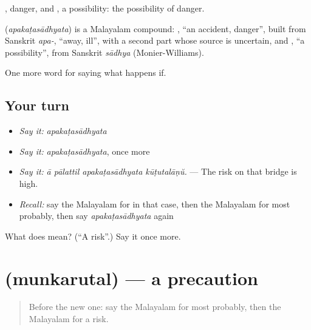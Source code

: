 , danger, and , a possibility: the possibility of danger.

\begin{cousinweb}
\textbf{} (\emph{apakaṭasādhyata}) is a Malayalam compound: , \textquotedblleft{}an accident, danger\textquotedblright{}, built from Sanskrit \emph{apa-}, \textquotedblleft{}away, ill\textquotedblright{}, with a second part whose source is uncertain, and , \textquotedblleft{}a possibility\textquotedblright{}, from Sanskrit \emph{sādhya} (Monier-Williams).
\end{cousinweb}

\begin{grammarlens}[title={What you've built}]
One more word for saying what happens if.
\end{grammarlens}

\subsection*{Your turn}
\begin{itemize}
\raggedright
  \item \emph{Say it:} \emph{apakaṭasādhyata}
  \item \emph{Say it:} \emph{apakaṭasādhyata}, once more
  \item \emph{Say it:} \emph{ā pālattil apakaṭasādhyata kūṭutalāṇŭ.} — The risk on that bridge is high.
  \item \emph{Recall:} say the Malayalam for in that case, then the Malayalam for most probably, then say \emph{apakaṭasādhyata} again
\end{itemize}

\begin{tcolorbox}[breakable,colback=teal!4,colframe=teal!35!black,title={Before you move on}]
What does  mean? (\textquotedblleft{}A risk\textquotedblright{}.) Say it once more.
\end{tcolorbox}
\section[\texorpdfstring{\ml{മുൻകരുതൽ} (munkarutal)}{മുൻകരുതൽ (munkarutal)}]{ (munkarutal) — a precaution}

\label{lesson:ML-C442-munkarutal}



\begin{quote}
Before the new one: say the Malayalam for most probably, then the Malayalam for a risk.
\end{quote}

